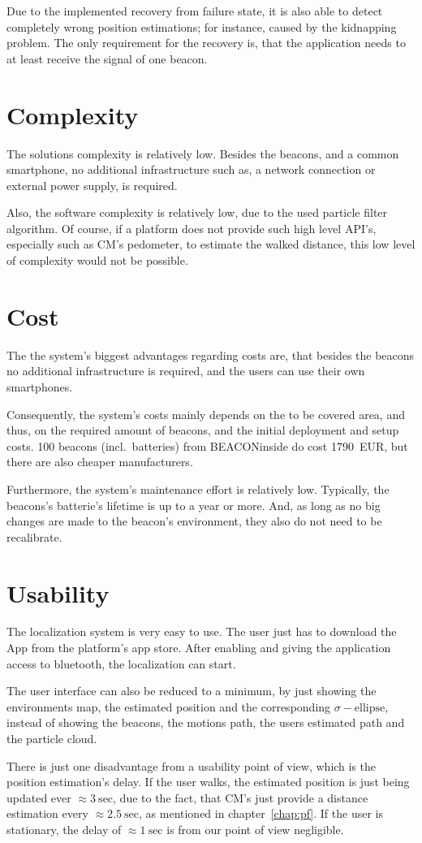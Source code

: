 Due to the implemented recovery from failure state, it is also able to detect completely wrong position estimations; for instance, caused by the kidnapping problem. The only requirement for the recovery is, that the application needs to at least receive the signal of one beacon.

\section{Complexity}
The solutions complexity is relatively low. Besides the beacons, and a common smartphone, no additional infrastructure such as, a network connection or external power supply, is required.
	
Also, the software complexity is relatively low, due to the used particle filter algorithm. Of course, if a platform does not provide such high level \acs{API}'s, especially such as \acl{CM}'s pedometer, to estimate the walked distance, this low level of complexity would not be possible.

\section{Cost}
The the system's biggest advantages regarding costs are, that besides the beacons no additional infrastructure is required, and the users can use their own smartphones.

Consequently, the system's costs mainly depends on the to be covered area, and thus, on the required amount of beacons, and the initial deployment and setup costs. 100 beacons (incl.\ batteries) from BEACONinside do cost 1790~EUR, but there are also cheaper manufacturers.

Furthermore, the system's maintenance effort is relatively low. Typically, the beacons's batterie's lifetime is up to a year or more. And, as long as no big changes are made to the beacon's environment, they also do not need to be recalibrate.

\section{Usability}
The localization system is very easy to use. The user just has to download the App from the platform's app store. After enabling and giving the application access to bluetooth, the localization can start.

The user interface can also be reduced to a minimum, by just showing the environments map, the estimated position and the corresponding $\sigma-\text{ellipse}$, instead of showing the beacons, the motions path, the users estimated path and the particle cloud.

There is just one disadvantage from a usability point of view, which is the position estimation's delay. If the user walks, the estimated position is just being updated ever $\approx 3~\text{sec}$, due to the fact, that \acs{CM}'s just provide a distance estimation every $\approx 2.5~\text{sec}$, as mentioned in chapter~\ref{chap:pf}. If the user is stationary, the delay of $\approx 1~\text{sec}$ is from our point of view negligible. 
